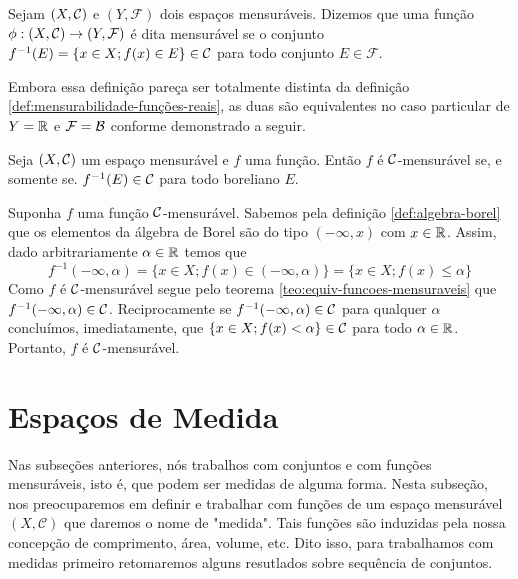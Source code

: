 \begin{definition}
	\label{def:mensurabilidade-geral}
	Sejam $(X, \operatorname{\mathcal{C}})$ e $(Y,\mathcal{F})$ dois espaços mensuráveis.
	Dizemos que uma função $\phi:(X, \operatorname{\mathcal{C}})\to (Y,\mathcal{F})$ é dita mensurável se o conjunto $f^{-1}(E) = \{x \in X; f(x)\in E\} \in \operatorname{\mathcal{C}}$ para todo conjunto $E \in \mathcal{F}$. 
\end{definition}

Embora essa definição pareça ser totalmente distinta da definição \ref{def:mensurabilidade-funções-reais}, as duas são equivalentes no caso particular de $Y = \mathbb{R}$ e $\mathcal{F} = \operatorname{\mathcal{B}}$ conforme demonstrado a seguir.

\begin{proposition}
	Seja $(X, \operatorname{\mathcal{C}})$ um espaço mensurável e $f$ uma função.
	Então $f$ é $\operatorname{\mathcal{C}}$-mensurável se, e somente se. $f^{-1}(E) \in \operatorname{\mathcal{C}}$ para todo boreliano $E$. 
\end{proposition}
\begin{prova}
	Suponha $f$ uma função $\operatorname{\mathcal{C}}$-mensurável. 
	Sabemos pela definição \ref{def:algebra-borel} que os elementos da álgebra de Borel são do tipo $(-\infty,x)$ com $x \in \mathbb{R}$.
	Assim, dado arbitrariamente $\alpha \in \mathbb{R}$ temos que
	$$
	f^{-1}(-\infty, \alpha)
	=\{x \in X; f(x) \in (-\infty, \alpha)\}
	=\{x \in X; f(x) \leq \alpha\}
	$$
	Como $f$ é $\operatorname{\mathcal{C}}$-mensurável segue pelo teorema \ref{teo:equiv-funcoes-mensuraveis} que $f^{-1}(-\infty, \alpha) \in \operatorname{\mathcal{C}}$.
	Reciprocamente se 
	$f^{-1}(-\infty, \alpha) \in \operatorname{\mathcal{C}}$ para qualquer $\alpha$ concluímos, imediatamente, que $\{x \in X; f(x) < \alpha\} \in \operatorname{\mathcal{C}}$ para todo $\alpha \in \mathbb{R}$.
	Portanto, $f$ é $\operatorname{\mathcal{C}}$-mensurável.
\end{prova}

\section{Espaços de Medida}

Nas subseções anteriores, nós trabalhos com conjuntos e com funções mensuráveis, isto é, que podem ser medidas de alguma forma.
Nesta subseção, nos preocuparemos em definir e trabalhar com funções de um espaço mensurável $(X, \mathcal{C})$ que daremos o nome de "medida".
Tais funções são induzidas pela nossa concepção de comprimento, área, volume, etc.
Dito isso, para trabalhamos com medidas primeiro retomaremos alguns resutlados sobre sequência de conjuntos.

